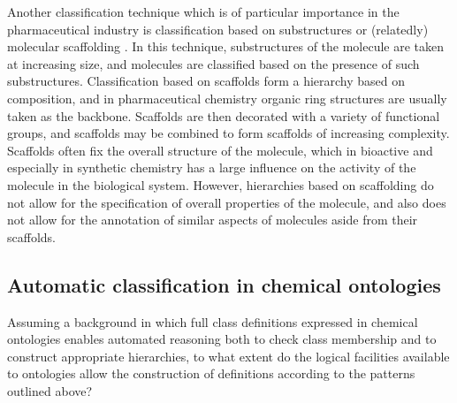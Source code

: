 \documentclass[10pt]{bmc_article}
\newenvironment{bmcformat}{\baselineskip20pt\sloppy\setboolean{publ}{false}}{\baselineskip20pt\sloppy}
\begin{document}
\begin{bmcformat}
Another classification technique which is of particular importance in the pharmaceutical industry is classification based on substructures \cite{deshpande2005} or (relatedly) molecular scaffolding \cite{FindSomething}.  In this technique, substructures of the molecule are taken at increasing size, and molecules are classified based on the presence of such substructures.  Classification based on scaffolds form a hierarchy based on composition, and in pharmaceutical chemistry organic ring structures are usually taken as the backbone.  Scaffolds are then decorated with a variety of functional groups, and scaffolds may be combined to form scaffolds of increasing complexity. 
Scaffolds often fix the overall structure of the molecule, which in bioactive and especially in synthetic chemistry has a large influence on the activity of the molecule in the biological system.  However, hierarchies based on scaffolding do not allow for the specification of overall properties of the molecule, and also does not allow for the annotation of similar aspects of molecules aside from their scaffolds. 



\subsection*{Automatic classification in chemical ontologies}
\label{sec:resultschemontology}


Assuming a background in which full class definitions expressed in chemical ontologies enables automated reasoning both to check class membership and to construct appropriate hierarchies, to what extent do the logical facilities available to ontologies allow the construction of definitions according to the patterns outlined above? 


\end{bmcformat}
\end{document}
